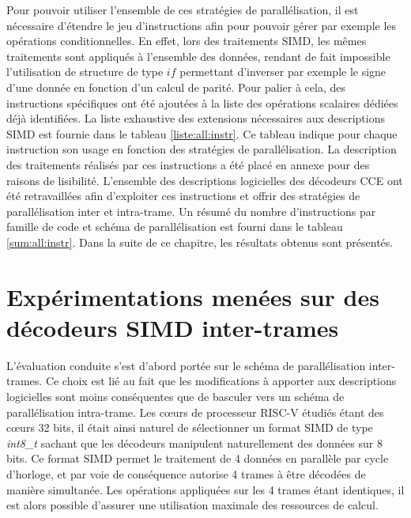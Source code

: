 \documentclass[../main.tex]{subfiles}
\begin{document}
Pour pouvoir utiliser l'ensemble de ces stratégies de parallélisation, il est nécessaire d'étendre le jeu d'instructions afin pour pouvoir gérer par exemple les opérations conditionnelles. 
En effet, lors des traitements SIMD, les mêmes traitements sont appliqués à l'ensemble des données, rendant de fait impossible l'utilisation de structure de type $if$ permettant d'inverser par exemple le signe d'une donnée en fonction d'un calcul de parité. 
Pour palier à cela, des instructions spécifiques ont été ajoutées à la liste des opérations scalaires dédiées déjà identifiées. 
La liste exhaustive des extensions nécessaires aux descriptions SIMD est fournie dans le tableau \ref{liste:all:instr}.
Ce tableau indique pour chaque instruction son usage en fonction des stratégies de parallélisation. 
La description des traitements réalisés par ces instructions a été placé en annexe pour des raisons de lisibilité. 
L'ensemble des descriptions logicielles des décodeurs CCE ont été retravaillées afin d'exploiter ces instructions et offrir des stratégies de parallélisation inter et intra-trame. 
Un résumé du nombre d'instructions par famille de code et schéma de parallélisation est fourni dans le tableau \ref{sum:all:instr}. 
Dans la suite de ce chapitre, les résultats obtenus sont présentés.

% 
% 
% 
% 
% 
\section{Expérimentations menées sur des décodeurs SIMD inter-trames}
% 
% 
% 
% 
% 

L'évaluation conduite s'est d'abord portée sur le schéma de parallélisation inter-trames. 
Ce choix est lié au fait que les modifications à apporter aux descriptions logicielles sont moins conséquentes que de basculer vers un schéma de parallélisation intra-trame.
Les cœurs de processeur RISC-V étudiés étant des cœurs 32 bits, il était ainsi naturel de sélectionner un format SIMD de type \textit{int8\_t } sachant que les décodeurs manipulent naturellement des données sur 8 bits. 
Ce format SIMD permet le traitement de 4 données en parallèle par cycle d'horloge, et par voie de conséquence autorise 4 trames à être décodées de manière simultanée. 
Les opérations appliquées sur les 4 trames étant identiques, il est alors possible d'assurer une utilisation maximale des ressources de calcul.
\end{document}
